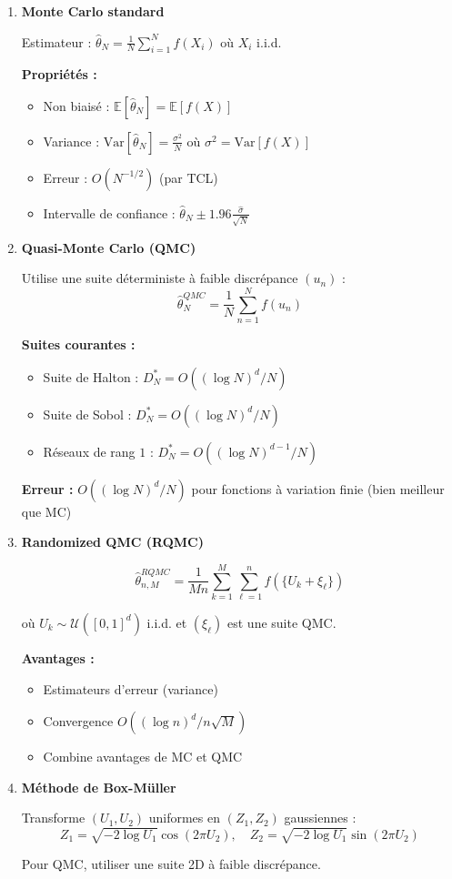 \documentclass[12pt,a4paper]{article}
\theoremstyle{definition}
\theoremstyle{remark}
\newcommand{\E}{\mathbb{E}}
\newcommand{\Var}{\text{Var}}
\begin{document}
\begin{enumerate}
\item \textbf{Monte Carlo standard}

Estimateur : $\hat{\theta}_N = \frac{1}{N}\sum_{i=1}^N f(X_i)$ où $X_i$ i.i.d.

\textbf{Propriétés :}
\begin{itemize}
\item Non biaisé : $\E[\hat{\theta}_N] = \E[f(X)]$
\item Variance : $\Var[\hat{\theta}_N] = \frac{\sigma^2}{N}$ où $\sigma^2 = \Var[f(X)]$
\item Erreur : $O(N^{-1/2})$ (par TCL)
\item Intervalle de confiance : $\hat{\theta}_N \pm 1.96\frac{\hat{\sigma}}{\sqrt{N}}$
\end{itemize}

\item \textbf{Quasi-Monte Carlo (QMC)}

Utilise une suite déterministe à faible discrépance $(u_n)$ :
\[
\hat{\theta}_N^{QMC} = \frac{1}{N}\sum_{n=1}^N f(u_n)
\]

\textbf{Suites courantes :}
\begin{itemize}
\item Suite de Halton : $D_N^* = O((\log N)^d / N)$
\item Suite de Sobol : $D_N^* = O((\log N)^d / N)$
\item Réseaux de rang $1$ : $D_N^* = O((\log N)^{d-1} / N)$
\end{itemize}

\textbf{Erreur :} $O((\log N)^d / N)$ pour fonctions à variation finie (bien meilleur que MC)

\item \textbf{Randomized QMC (RQMC)}

\[
\hat{\theta}_{n,M}^{RQMC} = \frac{1}{Mn}\sum_{k=1}^M \sum_{\ell=1}^n f(\{U_k + \xi_\ell\})
\]

où $U_k \sim \mathcal{U}([0,1]^d)$ i.i.d. et $(\xi_\ell)$ est une suite QMC.

\textbf{Avantages :}
\begin{itemize}
\item Estimateurs d'erreur (variance)
\item Convergence $O((\log n)^d / n\sqrt{M})$
\item Combine avantages de MC et QMC
\end{itemize}

\item \textbf{Méthode de Box-Müller}

Transforme $(U_1, U_2)$ uniformes en $(Z_1, Z_2)$ gaussiennes :
\[
Z_1 = \sqrt{-2\log U_1}\cos(2\pi U_2), \quad Z_2 = \sqrt{-2\log U_1}\sin(2\pi U_2)
\]

Pour QMC, utiliser une suite 2D à faible discrépance.
\end{enumerate}
\end{document}
